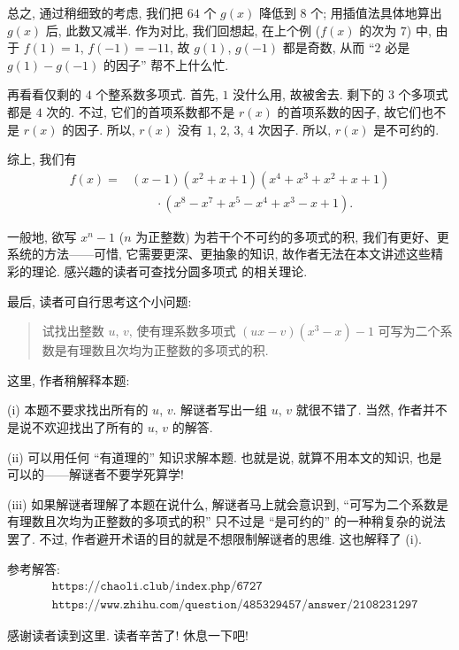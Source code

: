 \begin{example}
    总之, 通过稍细致的考虑, 我们把 $64$ 个 $g(x)$ 降低到 $8$ 个; 用插值法具体地算出 $g(x)$ 后, 此数又减半. 作为对比, 我们回想起, 在上个例 ($f(x)$ 的次为 $7$) 中, 由于 $f(1) = 1$, $f(-1) = -11$, 故 $g(1)$, $g(-1)$ 都是奇数, 从而 ``$2$ 必是 $g(1) - g(-1)$ 的因子'' 帮不上什么忙.

    再看看仅剩的 $4$ 个整系数多项式. 首先, $1$ 没什么用, 故被舍去. 剩下的 $3$ 个多项式都是 $4$ 次的. 不过, 它们的首项系数都不是 $r(x)$ 的首项系数的因子, 故它们也不是 $r(x)$ 的因子. 所以, $r(x)$ 没有 $1$, $2$, $3$, $4$ 次因子. 所以, $r(x)$ 是不可约的.

    综上, 我们有
    \begin{align*}
        f(x)
        = {} & (x-1) (x^2+x+1) (x^4+x^3+x^2+x+1)       \\
             & \qquad \cdot (x^8-x^7+x^5-x^4+x^3-x+1).
    \end{align*}
\end{example}

\begin{remark}
    一般地, 欲写 $x^n - 1$ ($n$ 为正整数) 为若干个不可约的多项式的积, 我们有更好、更系统的方法——可惜, 它需要更深、更抽象的知识, 故作者无法在本文讲述这些精彩的理论. 感兴趣的读者可查找分圆多项式  的相关理论.
\end{remark}

最后, 读者可自行思考这个小问题:

\begin{quotation}
    试找出整数 $u$, $v$, 使有理系数多项式 $(ux - v)(x^3 - x) - 1$ 可写为二个系数是有理数且次均为正整数的多项式的积.
\end{quotation}

这里, 作者稍解释本题:

(i) 本题不要求找出所有的 $u$, $v$. 解谜者写出一组 $u$, $v$ 就很不错了. 当然, 作者并不是说不欢迎找出了所有的 $u$, $v$ 的解答.

(ii) 可以用任何 ``有道理的'' 知识求解本题. 也就是说, 就算不用本文的知识, 也是可以的——解谜者不要学死算学!

(iii) 如果解谜者理解了本题在说什么, 解谜者马上就会意识到, ``可写为二个系数是有理数且次均为正整数的多项式的积'' 只不过是 ``是可约的'' 的一种稍复杂的说法罢了. 不过, 作者避开术语的目的就是不想限制解谜者的思维. 这也解释了 (i).

参考解答:
\begin{align*}
     & \texttt{https://chaoli.club/index.php/6727}                         \\
     & \texttt{https://www.zhihu.com/question/485329457/answer/2108231297}
\end{align*}

感谢读者读到这里. 读者辛苦了! 休息一下吧!
